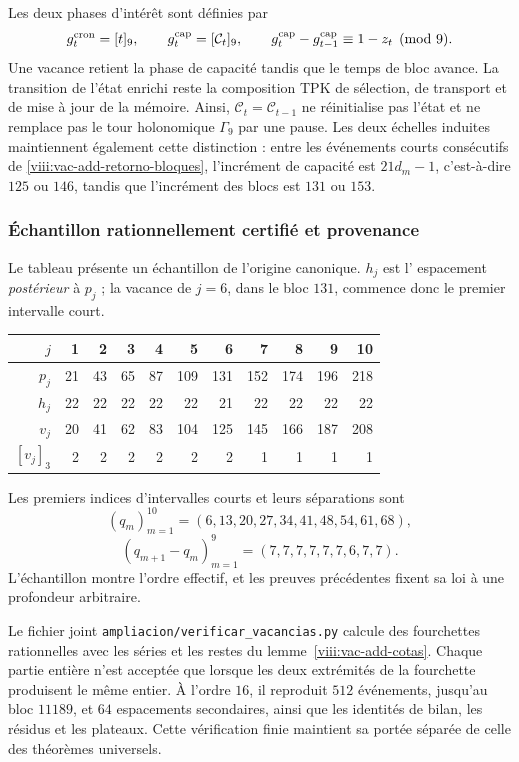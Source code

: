 Les deux phases d'intérêt sont définies par
\[
 g_t^{\rm cron}=[t]_9,
 \qquad g_t^{\rm cap}=[\mathcal C_t]_9,
 \qquad
 g_t^{\rm cap}-g_{t-1}^{\rm cap}\equiv1-z_t\pmod9.
\]
Une vacance retient la phase de capacité tandis que le temps de bloc
avance. La transition de l'état enrichi reste la composition
TPK de sélection, de transport et de mise à jour de la mémoire. Ainsi,
\(\mathcal C_t=\mathcal C_{t-1}\) ne réinitialise pas l'état et ne
remplace pas le tour holonomique \(\Gamma_9\) par une pause. Les
deux échelles induites maintiennent également cette distinction : entre les événements
courts consécutifs de \eqref{viii:vac-add-retorno-bloques}, l'incrément de
capacité est \(21d_m-1\), c'est-à-dire \(125\) ou \(146\), tandis que
l'incrément des blocs est \(131\) ou \(153\).

\subsubsection{Échantillon rationnellement certifié et provenance}
\label{viii:vac-add-muestra}

Le tableau présente un échantillon de l'origine canonique. \(h_j\) est l'
espacement \emph{postérieur} à \(p_j\) ; la vacance de
\(j=6\), dans le bloc \(131\), commence donc le premier intervalle court.
\begin{center}
\small
\begin{tabular}{r|rrrrrrrrrr}
\toprule
\(j\)&1&2&3&4&5&6&7&8&9&10\\
\midrule
\(p_j\)&21&43&65&87&109&131&152&174&196&218\\
\(h_j\)&22&22&22&22&22&21&22&22&22&22\\
\(v_j\)&20&41&62&83&104&125&145&166&187&208\\
\([v_j]_3\)&2&2&2&2&2&2&1&1&1&1\\
\bottomrule
\end{tabular}
\end{center}
Les premiers indices d'intervalles courts et leurs séparations sont
\[
 (q_m)_{m=1}^{10}=(6,13,20,27,34,41,48,54,61,68),
\]
\[
 (q_{m+1}-q_m)_{m=1}^{9}=(7,7,7,7,7,7,6,7,7).
\]
L'échantillon montre l'ordre effectif, et les preuves précédentes fixent sa loi à une profondeur arbitraire.

Le fichier joint \texttt{ampliacion/verificar\_vacancias.py} calcule
des fourchettes rationnelles avec les séries et les restes du
lemme~\ref{viii:vac-add-cotas}. Chaque partie entière n'est acceptée que lorsque
les deux extrémités de la fourchette produisent le même entier. À l'ordre
\(16\), il reproduit \(512\) événements, jusqu'au bloc \(11189\), et
\(64\) espacements secondaires, ainsi que les identités de bilan,
les résidus et les plateaux. Cette vérification finie maintient sa portée
séparée de celle des théorèmes universels.

